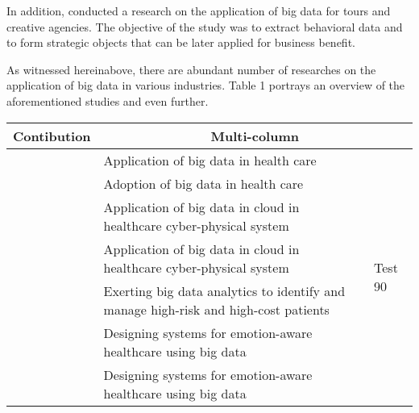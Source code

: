 In addition, \cite{Zhang2019a} conducted a research on the application of big data for tours and creative agencies. The objective of the study was to extract behavioral data and to form strategic objects that can be later applied for business benefit.

As witnessed hereinabove, there are abundant number of researches on the application of big data in various industries. Table 1 portrays an overview of the aforementioned studies and even further.

\begin{center}
    \begin{tabular}{|p{6cm}|p{6cm}|p{1cm}|}
        \hline
        Contibution                & \multicolumn{2}{c|}{Multi-column}                                                                                                 \\
        \hline
        \cite{Luo2016}             & Application of big data in health care                                              & \multirow{10}{*}{\begin{turn}{-90} Test 90 \end{turn}} \\

        \cite{Murdoch2013}         & Adoption of big data in health care                                                 &                                             \\

        \cite{Zhang2015}           & Application of big data in cloud in healthcare cyber-physical system                &                                             \\

        \cite{Zhang2015}           & Application of big data in cloud in healthcare cyber-physical system                &                                             \\

        \cite{Bates2014}           & Exerting big data analytics to identify and manage high-risk and high-cost patients &                                             \\

        \cite{Lin2016}             & Designing systems for emotion-aware healthcare using big data                       &                                             \\

        \cite{Lin2016}             & Designing systems for emotion-aware healthcare using big data                       &                                             \\


\end{tabular}
\end{center}
